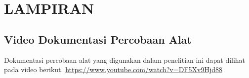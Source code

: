 \chapter{LAMPIRAN}

\section{Video Dokumentasi Percobaan Alat}
Dokumentasi percobaan alat yang digunakan dalam penelitian ini dapat dilihat pada video berikut.
\url{https://www.youtube.com/watch?v=DF5Xv9Hjd88}




